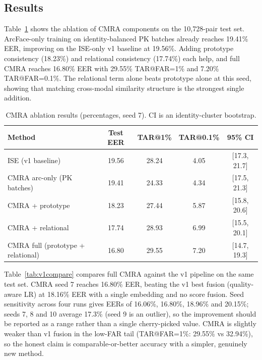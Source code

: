 \documentclass[12pt,a4paper]{article}
\begin{document}
\subsection{Results}
Table~\ref{tab:ablation} shows the ablation of CMRA components on the 10,728-pair test set. ArcFace-only training on identity-balanced PK batches already reaches 19.41\% EER, improving on the ISE-only v1 baseline at 19.56\%. Adding prototype consistency (18.23\%) and relational consistency (17.74\%) each help, and full CMRA reaches 16.80\% EER with 29.55\% TAR@FAR=1\% and 7.20\% TAR@FAR=0.1\%. The relational term alone beats prototype alone at this seed, showing that matching cross-modal similarity structure is the strongest single addition.

\begin{table}[H]
    \centering
    \caption{CMRA ablation results (percentages, seed 7). CI is an identity-cluster bootstrap.}
    \label{tab:ablation}
    \begin{tabular}{lcccc}
    \toprule
    Method & Test EER & TAR@1\% & TAR@0.1\% & 95\% CI \\
    \midrule
    ISE (v1 baseline) & 19.56 & 28.24 & 4.05 & [17.3, 21.7] \\
    CMRA arc-only (PK batches) & 19.41 & 24.33 & 4.34 & [17.5, 21.3] \\
    CMRA + prototype & 18.23 & 27.44 & 5.87 & [15.8, 20.6] \\
    CMRA + relational & 17.74 & 28.93 & 6.99 & [15.5, 20.1] \\
    CMRA full (prototype + relational) & 16.80 & 29.55 & 7.20 & [14.7, 19.3] \\
    \bottomrule
    \end{tabular}
\end{table}

Table~\ref{tab:v1compare} compares full CMRA against the v1 pipeline on the same test set. CMRA seed 7 reaches 16.80\% EER, beating the v1 best fusion (quality-aware LR) at 18.16\% EER with a single embedding and no score fusion. Seed sensitivity across four runs gives EERs of 16.06\%, 16.80\%, 18.96\% and 20.15\%; seeds 7, 8 and 10 average 17.3\% (seed 9 is an outlier), so the improvement should be reported as a range rather than a single cherry-picked value. CMRA is slightly weaker than v1 fusion in the low-FAR tail (TAR@FAR=1\%: 29.55\% vs 32.94\%), so the honest claim is comparable-or-better accuracy with a simpler, genuinely new method.
\end{document}
